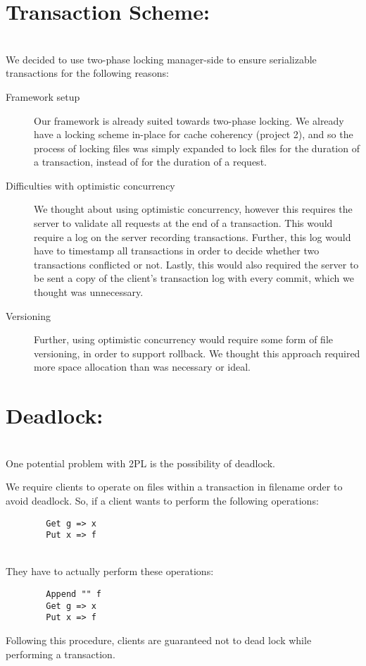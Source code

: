 \documentclass[11pt]{article}
\begin{document}
\section{Transaction Scheme:} \\

We decided to use two-phase locking manager-side to ensure serializable transactions for the following reasons:

\begin{description}
	\item[Framework setup] Our framework is already suited towards two-phase locking. We already have a locking scheme in-place for cache coherency (project 2), and so the process of locking files was 
simply expanded to lock files for the duration of a transaction, instead of for the duration of a request.
	\item[Difficulties with optimistic concurrency] We thought about using optimistic concurrency, however this requires the server to validate all requests at the end of a transaction. This would require a log on the server recording transactions. Further, this log would have to timestamp all transactions in order to decide whether two transactions conflicted or not. Lastly, this would also required the server to be sent a copy of the client's transaction log with every commit, which we thought was unnecessary. 
        \item[Versioning] Further, using optimistic concurrency would require some form of file versioning, in order to support rollback. We thought this approach required more space allocation than was necessary or ideal.
\end{description}

\section{Deadlock:} \\

One potential problem with 2PL is the possibility of deadlock.

We require clients to operate on files within a transaction in filename order to avoid deadlock.
So, if a client wants to perform the following operations: 
\begin{verbatim}
        Get g => x
        Put x => f
\end{verbatim}\\
They have to actually perform these operations:
\begin{verbatim}
        Append "" f
        Get g => x
        Put x => f
\end{verbatim}
Following this procedure, clients are guaranteed not to dead lock while performing a transaction.
\end{document}

